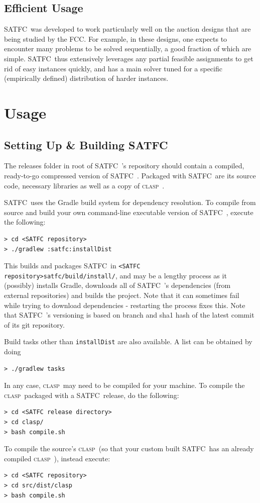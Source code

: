 \documentclass[
10pt, %
letterpaper, %
oneside, %
headinclude,footinclude, %
BCOR5mm, %
needspace, %
]{scrartcl}
\newcommand{\SATFC}{\textsc{SATFC}~}
\newcommand{\clasp}{\textsc{clasp}~}
\begin{document}
\subsection{Efficient Usage}
\SATFC was developed to work particularly well on the auction designs that are being studied by the FCC. For example, in these designs, one expects to encounter many problems to be solved sequentially, a good fraction of which are simple. \SATFC thus extensively leverages any partial feasible assignments to get rid of easy instances quickly, and has a main solver tuned for a specific (empirically defined) distribution of harder instances.

\section{Usage}\label{sec:usage}

\subsection{Setting Up \& Building \SATFC}

The releases folder in root of \SATFC's repository should contain a compiled, ready-to-go compressed version of \SATFC. Packaged with \SATFC are its source code, necessary libraries as well as a copy of \clasp. 

\SATFC uses the Gradle build system for dependency resolution. To compile from source and build your own command-line executable version of \SATFC, execute the following:
\begin{lstlisting}[style=Bash]
> cd <SATFC repository>
> ./gradlew :satfc:installDist
\end{lstlisting}
This builds and packages \SATFC in \texttt{<SATFC repository>satfc/build/install/}, and may be a lengthy process as it (possibly) installs Gradle, downloads all of \SATFC's dependencies (from external repositories) and builds the project. Note that it can sometimes fail while trying to download dependencies - restarting the process fixes this. Note that \SATFC's versioning is based on branch and sha1 hash of the latest commit of its git repository. 

Build tasks other than \texttt{installDist} are also available. A list can be obtained by doing
\begin{lstlisting}[style=Bash]
> ./gradlew tasks
\end{lstlisting}

In any case, \clasp may need to be compiled for your machine. To compile the \clasp packaged with a \SATFC release, do the following:
\begin{lstlisting}[style=Bash]
> cd <SATFC release directory>
> cd clasp/
> bash compile.sh
\end{lstlisting}
To compile the source's \clasp (so that your custom built \SATFC has an already compiled \clasp), instead execute:
\begin{lstlisting}[style=Bash]
> cd <SATFC repository>
> cd src/dist/clasp
> bash compile.sh
\end{lstlisting}
\end{document}
